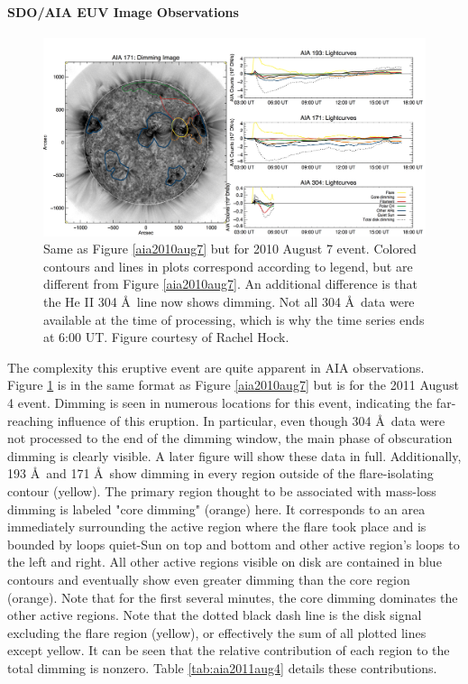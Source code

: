 \paragraph{SDO/AIA EUV Image Observations}

\begin{figure}[!h]
    \begin{center}
	    \includegraphics[width=166mm]{Images/Aia2011Aug4.png}
    \end{center}
    \caption[AIA contour analysis for 2011 August 4 event]{
        Same as Figure \ref{aia2010aug7} but for 2010 August 7 event. Colored contours and lines in plots correspond 
        according to legend, but are different from Figure \ref{aia2010aug7}. An additional difference is that the He II
        304 \AA\ line now shows dimming. Not all 304 \AA\ data were available at the time of processing, which is why the 
        time series ends at 6:00 UT. Figure courtesy of Rachel Hock. 
	}
    \label{aia2011aug4}
\end{figure}

The complexity this eruptive event are quite apparent in AIA observations. Figure \ref{aia2011aug4} is in the same format as Figure \ref{aia2010aug7} but is for the 2011 August 4 event. Dimming is seen in numerous locations for this event, indicating the far-reaching influence of this eruption. In particular, even though 304 \AA\ data were not processed to the end of the dimming window, the main phase of obscuration dimming is clearly visible. A later figure will show these data in full. Additionally, 193 \AA\ and 171 \AA\ show dimming in every region outside of the flare-isolating contour (yellow). The primary region thought to be associated with mass-loss dimming is labeled "core dimming" (orange) here. It corresponds to an area immediately surrounding the active region where the flare took place and is bounded by loops quiet-Sun on top and bottom and other active region's loops to the left and right. All other active regions visible on disk are contained in blue contours and eventually show even greater dimming than the core region (orange). Note that for the first several minutes, the core dimming dominates the other active regions. Note that the dotted black dash line is the disk signal excluding the flare region (yellow), or effectively the sum of all plotted lines except yellow. It can be seen that the relative contribution of each region to the total dimming is nonzero. Table \ref{tab:aia2011aug4} details these contributions. 

